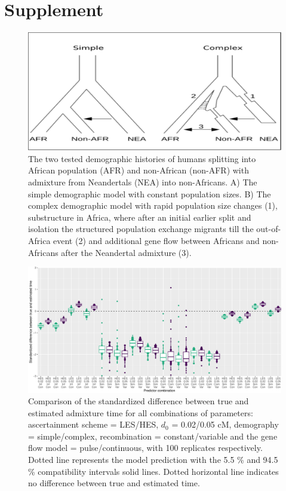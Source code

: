 \documentclass[]{article}
\begin{document}
\hypertarget{refs}{}




\pagebreak
\setcounter{figure}{0} \renewcommand{\figurename}{Fig. S}
\renewcommand{\tablename}{Tab. S}

\section{Supplement}\label{supplement}

\begin{figure}
\centering
\includegraphics{Admixture_Time_Inference_Paper_Draft_files/figure-latex/figS1-1.pdf}
\caption{\label{fig:figS1} The two tested demographic histories of humans splitting into African population (AFR) and non-African (non-AFR) with admixture from Neandertals (NEA) into non-Africans. A) The simple demographic model with constant population sizes. B) The complex demographic model with rapid population size changes (1), substructure in Africa, where after an initial earlier split and isolation the structured population exchange migrants till the out-of-Africa event (2) and additional gene flow between Africans and non-Africans after the Neandertal admixture (3).}
\end{figure}

\begin{figure}
\centering
\includegraphics{Admixture_Time_Inference_Paper_Draft_files/figure-latex/figS2-1.pdf}
\caption{\label{fig:figS2} Comparison of the standardized difference between true and estimated admixture time for all combinations of parameters: ascertainment scheme = LES/HES,  $d_{0}$ = 0.02/0.05 cM, demography = simple/complex, recombination = constant/variable and the gene flow model = pulse/continuous, with 100 replicates respectively. Dotted line represents the model prediction with the 5.5 \% and 94.5 \% compatibility intervals solid lines. Dotted horizontal line indicates no difference between true and estimated time.}
\end{figure}
\end{document}
